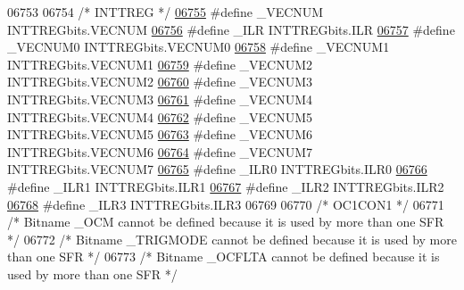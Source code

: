 \begin{DoxyCode}
06753 
06754 \textcolor{comment}{/* INTTREG */}
\hypertarget{a00015_source_l06755}{}\hyperlink{a00015_adecbf36d58511ae315fa7d2cad798796}{06755} \textcolor{preprocessor}{#define \_VECNUM INTTREGbits.VECNUM}
\hypertarget{a00015_source_l06756}{}\hyperlink{a00015_ac393caa490a0058e0213df0753d24d18}{06756} \textcolor{preprocessor}{#define \_ILR INTTREGbits.ILR}
\hypertarget{a00015_source_l06757}{}\hyperlink{a00015_a72778cf8f00d28ad0f3cca2933287f20}{06757} \textcolor{preprocessor}{#define \_VECNUM0 INTTREGbits.VECNUM0}
\hypertarget{a00015_source_l06758}{}\hyperlink{a00015_a2c8476d762a4278a8624ea39d7785599}{06758} \textcolor{preprocessor}{#define \_VECNUM1 INTTREGbits.VECNUM1}
\hypertarget{a00015_source_l06759}{}\hyperlink{a00015_af27b0b978b841602e934f95fe6c7bfc3}{06759} \textcolor{preprocessor}{#define \_VECNUM2 INTTREGbits.VECNUM2}
\hypertarget{a00015_source_l06760}{}\hyperlink{a00015_ae1ee44a63374e5f6ec90308e00c89055}{06760} \textcolor{preprocessor}{#define \_VECNUM3 INTTREGbits.VECNUM3}
\hypertarget{a00015_source_l06761}{}\hyperlink{a00015_aa4a367cda3c8b98ab2f3dbfd6d50a2fa}{06761} \textcolor{preprocessor}{#define \_VECNUM4 INTTREGbits.VECNUM4}
\hypertarget{a00015_source_l06762}{}\hyperlink{a00015_a18a20275f0edd32c159609971e7a82af}{06762} \textcolor{preprocessor}{#define \_VECNUM5 INTTREGbits.VECNUM5}
\hypertarget{a00015_source_l06763}{}\hyperlink{a00015_a7f1c44c248072ba41e1c0e350f8b54cc}{06763} \textcolor{preprocessor}{#define \_VECNUM6 INTTREGbits.VECNUM6}
\hypertarget{a00015_source_l06764}{}\hyperlink{a00015_a1b51c25a0cf6bc247672f686040aba9f}{06764} \textcolor{preprocessor}{#define \_VECNUM7 INTTREGbits.VECNUM7}
\hypertarget{a00015_source_l06765}{}\hyperlink{a00015_a7a75bd3a20a78283d48f95319af0695a}{06765} \textcolor{preprocessor}{#define \_ILR0 INTTREGbits.ILR0}
\hypertarget{a00015_source_l06766}{}\hyperlink{a00015_a70ffafff7741e9fa4a7906b65ddf67e2}{06766} \textcolor{preprocessor}{#define \_ILR1 INTTREGbits.ILR1}
\hypertarget{a00015_source_l06767}{}\hyperlink{a00015_ab4d0cf04564e68662cfb21aaaac76c93}{06767} \textcolor{preprocessor}{#define \_ILR2 INTTREGbits.ILR2}
\hypertarget{a00015_source_l06768}{}\hyperlink{a00015_a28c7a3c93e985b8137fab7b82fe5f726}{06768} \textcolor{preprocessor}{#define \_ILR3 INTTREGbits.ILR3}
06769 
06770 \textcolor{comment}{/* OC1CON1 */}
06771 \textcolor{comment}{/* Bitname \_OCM cannot be defined because it is used by more than one SFR */}
06772 \textcolor{comment}{/* Bitname \_TRIGMODE cannot be defined because it is used by more than one SFR */}
06773 \textcolor{comment}{/* Bitname \_OCFLTA cannot be defined because it is used by more than one SFR */}

\end{DoxyCode}
